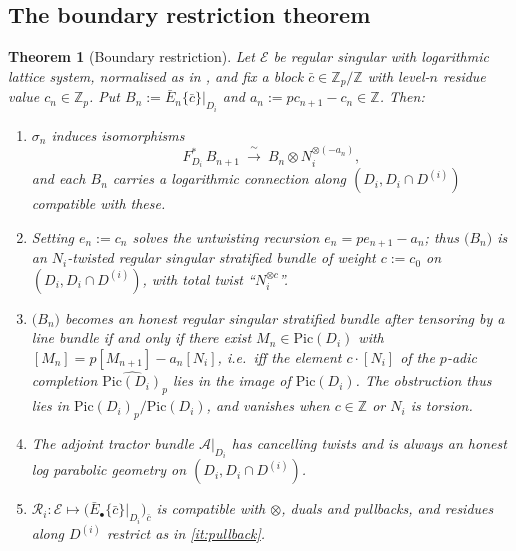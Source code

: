 \documentclass[11pt,reqno]{amsart}
\newcommand{\Zp}{\mathbb{Z}_p}
\newcommand{\ZZ}{\mathbb{Z}}
\newcommand{\cE}{\mathcal{E}}
\newcommand{\cA}{\mathcal{A}}
\newcommand{\cR}{\mathcal{R}}
\newcommand{\Pic}{\mathrm{Pic}}
\newcommand{\isoto}{\xrightarrow{\ \sim\ }}
\theoremstyle{plain}
\newtheorem{theorem}{Theorem}[section]
\theoremstyle{definition}
\theoremstyle{remark}
\numberwithin{equation}{section}
\begin{document}
\subsection{The boundary restriction theorem}

\begin{theorem}[Boundary restriction]\label{thm:boundary}
Let $\cE$ be regular singular with logarithmic lattice system, normalised
as in , and fix a block $\bar c\in\Zp/\ZZ$ with
level-$n$ residue value $c_n\in\Zp$.  Put $B_n:=\bar E_n\{\bar c\}|_{D_i}$
and $a_n:=pc_{n+1}-c_n\in\ZZ$.  Then:
\begin{enumerate}
\item $\sigma_n$ induces isomorphisms
\[
   F_{D_i}^*\,B_{n+1}\ \isoto\ B_n\otimes N_i^{\otimes(-a_n)} ,
\]
and each $B_n$ carries a logarithmic connection along
$(D_i,D_i\cap D^{(i)})$ compatible with these.
\item Setting $e_n:=c_n$ solves the untwisting recursion
      $e_n=pe_{n+1}-a_n$; thus $\bigl(B_n\bigr)$ is an
      \emph{$N_i$-twisted regular singular stratified bundle of weight
      $c:=c_0$} on $(D_i,D_i\cap D^{(i)})$, with total twist
      ``$N_i^{\otimes c}$''.
\item $\bigl(B_n\bigr)$ becomes an honest regular singular stratified
      bundle after tensoring by a line bundle if and only if there exist
      $M_n\in\Pic(D_i)$ with $[M_n]=p[M_{n+1}]-a_n[N_i]$, i.e.\ iff the
      element $c\cdot[N_i]$ of the $p$-adic completion
      $\widehat{\Pic(D_i)}_p$ lies in the image of $\Pic(D_i)$.  The
      obstruction thus lies in $\widehat{\Pic(D_i)}_p/\Pic(D_i)$, and
      vanishes when $c\in\ZZ$ or $N_i$ is torsion.
\item The adjoint tractor bundle $\cA|_{D_i}$ has cancelling twists and is
      always an honest log parabolic geometry on
      $(D_i,D_i\cap D^{(i)})$.
\item $\cR_i\colon\cE\mapsto\bigl(\bar E_\bullet\{\bar c\}|_{D_i}\bigr)_{\bar c}$
      is compatible with $\otimes$, duals and pullbacks, and residues along
      $D^{(i)}$ restrict as in
      \eqref{it:pullback}.
\end{enumerate}
\end{theorem}
\end{document}
